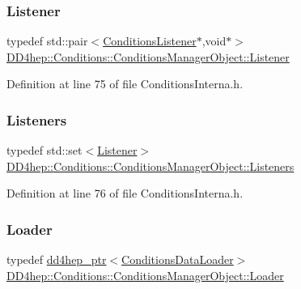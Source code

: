 \subsubsection{\texorpdfstring{Listener}{Listener}}
{\footnotesize\ttfamily typedef std\+::pair$<$\hyperlink{class_d_d4hep_1_1_conditions_1_1_conditions_listener}{Conditions\+Listener}$\ast$,void$\ast$$>$ \hyperlink{class_d_d4hep_1_1_conditions_1_1_conditions_manager_object_ac4cd1e3a448bc1f8bae384d194f10c23}{D\+D4hep\+::\+Conditions\+::\+Conditions\+Manager\+Object\+::\+Listener}}



Definition at line 75 of file Conditions\+Interna.\+h.

\hypertarget{class_d_d4hep_1_1_conditions_1_1_conditions_manager_object_aba0162524bc90a39e30bd5f1f0067ee2}{}\label{class_d_d4hep_1_1_conditions_1_1_conditions_manager_object_aba0162524bc90a39e30bd5f1f0067ee2} 
\subsubsection{\texorpdfstring{Listeners}{Listeners}}
{\footnotesize\ttfamily typedef std\+::set$<$\hyperlink{class_d_d4hep_1_1_conditions_1_1_conditions_manager_object_ac4cd1e3a448bc1f8bae384d194f10c23}{Listener}$>$ \hyperlink{class_d_d4hep_1_1_conditions_1_1_conditions_manager_object_aba0162524bc90a39e30bd5f1f0067ee2}{D\+D4hep\+::\+Conditions\+::\+Conditions\+Manager\+Object\+::\+Listeners}}



Definition at line 76 of file Conditions\+Interna.\+h.

\hypertarget{class_d_d4hep_1_1_conditions_1_1_conditions_manager_object_ab2df3fc6386b7f71ed3087271d90acc6}{}\label{class_d_d4hep_1_1_conditions_1_1_conditions_manager_object_ab2df3fc6386b7f71ed3087271d90acc6} 
\subsubsection{\texorpdfstring{Loader}{Loader}}
{\footnotesize\ttfamily typedef \hyperlink{class_d_d4hep_1_1dd4hep__ptr}{dd4hep\+\_\+ptr}$<$\hyperlink{class_d_d4hep_1_1_conditions_1_1_conditions_data_loader}{Conditions\+Data\+Loader}$>$ \hyperlink{class_d_d4hep_1_1_conditions_1_1_conditions_manager_object_ab2df3fc6386b7f71ed3087271d90acc6}{D\+D4hep\+::\+Conditions\+::\+Conditions\+Manager\+Object\+::\+Loader}}



